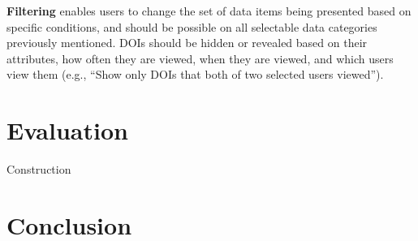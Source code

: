 	
\noindent \textbf{Filtering} enables users to change the set of data items being presented based on specific conditions, and should be possible on all selectable data categories previously mentioned. DOIs should be hidden or revealed based on their attributes, how often they are viewed, when they are viewed, and which users view them (e.g., ``Show only DOIs that both of two selected users viewed'').
	


\section{Evaluation}
Construction
\section{Conclusion}